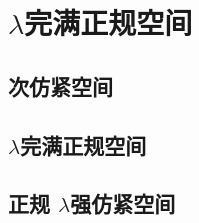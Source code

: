 \documentclass[main.tex]{subfiles}
\begin{document}
	
	
\chapter{$\lambda$完满正规空间}\label{ch10}
	
	\section{次仿紧空间}\label{sec:4.1}
	
	
	\section{$\lambda$完满正规空间}\label{sec:4.2}
	
	
	\section{正规	$\lambda$强仿紧空间}\label{sec:4.3}
	
\end{document}
